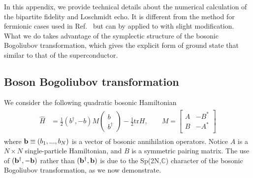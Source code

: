 
In this appendix, we provide technical details about the numerical calculation of the bipartite fidelity and Loschmidt echo. It is different from the method for fermionic cases used in Ref.~ but can by applied to with slight modification. What we do takes advantage of the symplectic structure of the bosonic Bogoliubov transformation, which gives the explicit form of ground state that similar to that of the superconductor. 

\subsection{Boson Bogoliubov transformation}
\label{app_sub:boson_BdG}
We consider the following quadratic bosonic Hamiltonian
\begin{eqnarray}\begin{aligned}
\label{eq:quadratic_boson_H}
\hat{H}%
&=
\frac{1}{2} (b^{\dagger}, -b)
M 
\begin{pmatrix}
b\\
b^{\dagger} 
\end{pmatrix}-\frac{1}{2}\text{tr}H, \qquad 
M = 
\begin{bmatrix}
A & -B^* \\
B & -A^* \\
\end{bmatrix}
\end{aligned}\end{eqnarray}
where ${\bf b}\equiv(b_{1},...,b_{N})$ is a vector of bosonic annihilation operators. Notice $A$ is a $N\times N$ single-particle Hamiltonian, and $B$ is a symmetric pairing matrix. The use of $({\bf b}^\dagger , -{\bf b})$ rather than $({\bf b}^\dagger , {\bf b})$ is due to the Sp(2N,$\mathbb{C}$) character of the bosonic Bogoliubov transformation, as we now demonstrate. 

